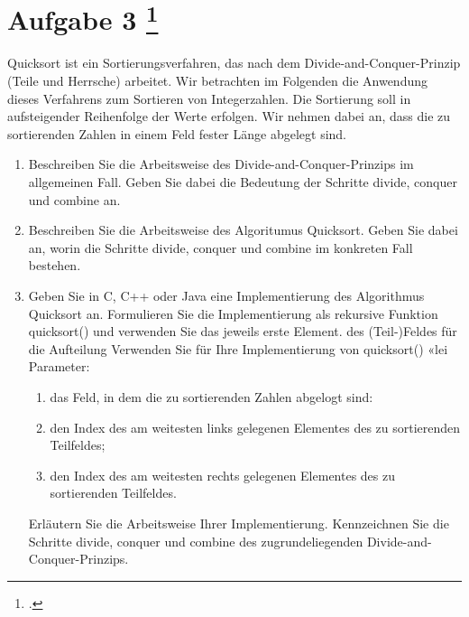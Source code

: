 \documentclass{lehramt-informatik-aufgabe}
\begin{document}
\liAufgabenTitel{}
\section{Aufgabe 3
\footcite{46114:2008:09}}

Quicksort ist ein Sortierungsverfahren, das nach dem
Divide-and-Conquer-Prinzip (Teile und Herrsche) arbeitet. Wir betrachten
im Folgenden die Anwendung dieses Verfahrens zum Sortieren von
Integerzahlen. Die Sortierung soll in aufsteigender Reihenfolge der
Werte erfolgen. Wir nehmen dabei an, dass die zu sortierenden Zahlen in
einem Feld fester Länge abgelegt sind.
\begin{enumerate}


\item Beschreiben Sie die Arbeitsweise des Divide-and-Conquer-Prinzips
im allgemeinen Fall. Geben Sie dabei die Bedeutung der Schritte divide,
conquer und combine an.


\item Beschreiben Sie die Arbeitsweise des Algoritumus Quicksort. Geben
Sie dabei an, worin die Schritte divide, conquer und combine im
konkreten Fall bestehen.


\item Geben Sie in C, C++ oder Java eine Implementierung des Algorithmus
Quicksort an. Formulieren Sie die Implementierung als rekursive Funktion
quicksort() und verwenden Sie das jeweils erste Element. des
(Teil-)Feldes für die Aufteilung Verwenden Sie für Ihre Implementierung
von quicksort() «lei Parameter:
\begin{enumerate}
\item

das Feld, in dem die zu sortierenden Zahlen abgelogt sind:

\item

den Index des am weitesten links gelegenen Elementes des zu sortierenden
Teilfeldes;

\item

den Index des am weitesten rechts gelegenen Elementes des zu
sortierenden Teilfeldes.
\end{enumerate}

Erläutern Sie die Arbeitsweise Ihrer Implementierung. Kennzeichnen Sie
die Schritte divide, conquer und combine des zugrundeliegenden
Divide-and-Conquer-Prinzips.
\end{enumerate}
\end{document}

